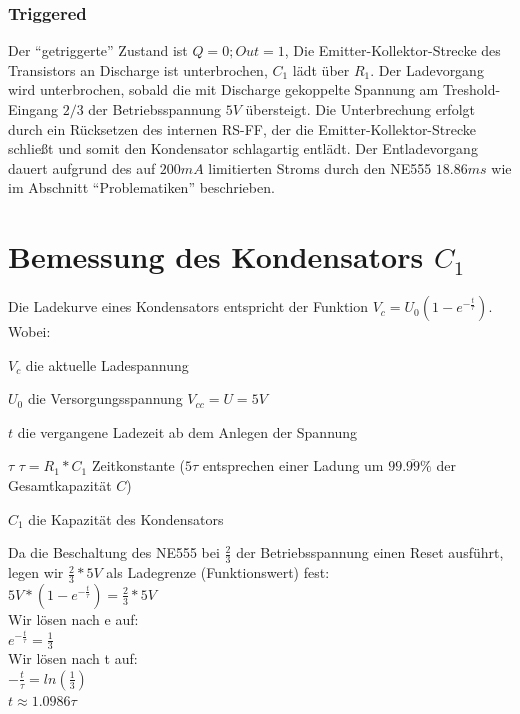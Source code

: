 \documentclass[12pt,titlepage]{article}
\begin{document}
		\subsubsection{Triggered}
			Der ``getriggerte'' Zustand ist $Q=0; Out=1$, Die Emitter-Kollektor-Strecke des Transistors an Discharge ist unterbrochen, $C_1$ lädt über $R_1$.
			Der Ladevorgang wird unterbrochen, sobald die mit Discharge gekoppelte Spannung am Treshold-Eingang $2/3$ der Betriebsspannung $5V$ übersteigt.
			Die Unterbrechung erfolgt durch ein Rücksetzen des internen RS-FF, der die Emitter-Kollektor-Strecke schließt und somit den Kondensator schlagartig entlädt.
			Der Entladevorgang dauert aufgrund des auf $200mA$ limitierten Stroms durch den NE555 $18.86ms$ wie im Abschnitt ``Problematiken'' beschrieben. 
			
	\section{Bemessung des Kondensators $C_1$}
		Die Ladekurve eines Kondensators entspricht der Funktion $V_c = U_0(1-e^{-\frac{t}{\tau}})$.
		Wobei:
		\begin{description*}
			\item[$V_c$] die aktuelle Ladespannung
			\item[$U_0$] die Versorgungsspannung $V_{cc}=U=5V$
			\item[$t$] die vergangene Ladezeit ab dem Anlegen der Spannung
			\item[$\tau$] $\tau=R_1*C_1$ Zeitkonstante ($5\tau$ entsprechen einer Ladung um $99.\overline{99}\%$ der Gesamtkapazität $C$)
			\item[$C_1$] die Kapazität des Kondensators
		\end{description*}
		Da die Beschaltung  des NE555 bei $\frac{2}{3}$ der Betriebsspannung einen Reset ausführt, legen wir $\frac{2}{3}*5V$ als Ladegrenze (Funktionswert) fest: \\
		$5V*(1-e^{-\frac{t}{\tau}}) = \frac{2}{3}*5V$ \\
		Wir lösen nach e auf: \\
		$e^{-\frac{t}{\tau}} = \frac{1}{3}$ \\
		Wir lösen nach t auf: \\
		$-\frac{t}{\tau} = ln(\frac{1}{3})$ \\
		$t \approx 1.0986\tau$ \\
		
\end{document}
